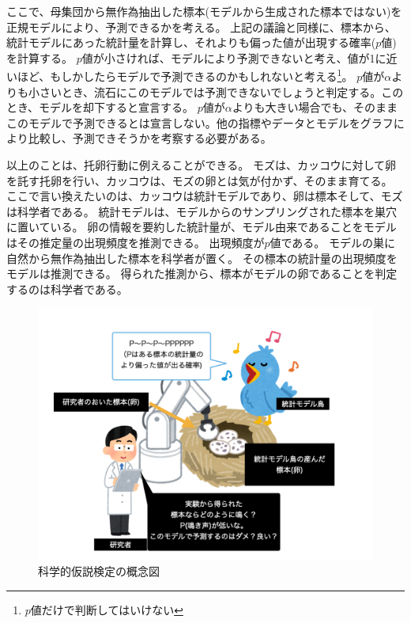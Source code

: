 ここで、母集団から無作為抽出した標本(モデルから生成された標本ではない)を正規モデルにより、予測できるかを考える。
上記の議論と同様に、標本から、統計モデルにあった統計量を計算し、それよりも偏った値が出現する確率($p$値)を計算する。
$p$値が小さければ、モデルにより予測できないと考え、値が1に近いほど、もしかしたらモデルで予測できるのかもしれないと考える\footnote{$p$値だけで判断してはいけない}。
$p$値が$\alpha$よりも小さいとき、流石にこのモデルでは予測できないでしょうと判定する。このとき、モデルを却下すると宣言する。
$p$値が$\alpha$よりも大きい場合でも、そのままこのモデルで予測できるとは宣言しない。他の指標やデータとモデルをグラフにより比較し、予測できそうかを考察する必要がある。



以上のことは、托卵行動に例えることができる。
モズは、カッコウに対して卵を託す托卵を行い、カッコウは、モズの卵とは気が付かず、そのまま育てる。
ここで言い換えたいのは、カッコウは統計モデルであり、卵は標本そして、モズは科学者である。
統計モデルは、モデルからのサンプリングされた標本を巣穴に置いている。
卵の情報を要約した統計量が、モデル由来であることをモデルはその推定量の出現頻度を推測できる。
出現頻度が$p$値である。
モデルの巣に自然から無作為抽出した標本を科学者が置く。
その標本の統計量の出現頻度をモデルは推測できる。
得られた推測から、標本がモデルの卵であることを判定するのは科学者である。

\begin{figure}
    \begin{center}
        \includegraphics[width=15cm]{./image/01_/conceptual_diagram/conceptual_diagram.003.png}
        \caption{科学的仮説検定の概念図}
        \label{fig:conceptual_diagram_test}
    \end{center}
\end{figure}
    

